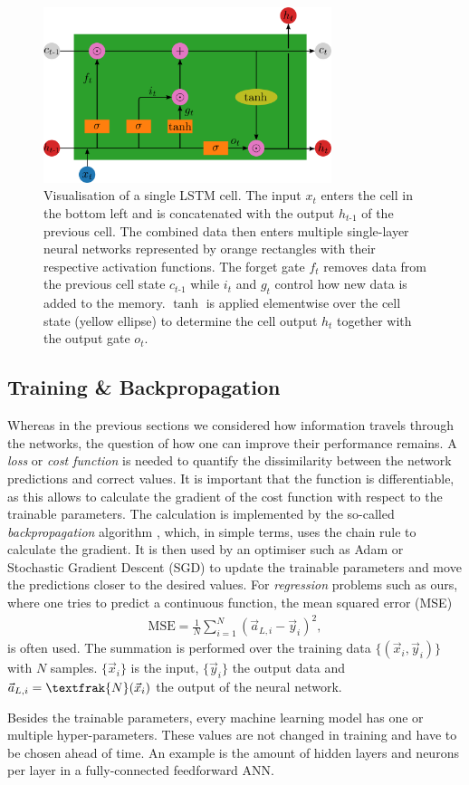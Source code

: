 \begin{figure}[h]
	\centering
	\includegraphics[width=0.75\textwidth]{img/lstm}
	\caption{Visualisation of a single LSTM cell. The input $x_t$ enters the cell in the bottom left and is concatenated with the output $h_{t\text{-}1}$ of the previous cell. The combined data then enters multiple single-layer neural networks represented by orange rectangles with their respective activation functions. The forget gate $f_t$ removes data from the previous cell state $c_{t\text{-}1}$ while $i_t$ and $g_t$ control how new data is added to the memory. $\tanh$ is applied elementwise over the cell state (yellow ellipse) to determine the cell output $h_t$ together with the output gate $o_t$.}
	\label{lstm}
\end{figure}

\newpage

\subsection{Training \& Backpropagation} \label{trainbackprop}
Whereas in the previous sections we considered how information travels through the networks, the question of how one can improve their performance remains.
A \textit{loss} or \textit{cost function} is needed to quantify the dissimilarity between the network predictions and correct values.
It is important that the function is differentiable, as this allows to calculate the gradient of the cost function with respect to the trainable parameters.
The calculation is implemented by the so-called \textit{backpropagation} algorithm \cite{rumelhart1986learning, nielsenneural}, which, in simple terms, uses the chain rule to calculate the gradient.
It is then used by an optimiser such as Adam \cite{kingma2017adam} or Stochastic Gradient Descent (SGD) to update the trainable parameters and move the predictions closer to the desired values.
For \textit{regression} problems such as ours, where one tries to predict a continuous function, the mean squared error (MSE)
\begin{align*}
\mathrm{MSE} = \frac{1}{N} \sum_{i=1}^N (\vec{a}_{L, i} - \vec{y}_i)^2,
\end{align*}
is often used.
The summation is performed over the training data $\{(\vec{x}_i, \vec{y}_i)\}$ with $N$ samples.
$\{\vec{x}_i\}$ is the input, $\{\vec{y}_i\}$ the output data and $\vec{a}_{L, i} = \textfrak{N}(\vec{x}_i)$ the output of the neural network.

Besides the trainable parameters, every machine learning model has one or multiple hyper-parameters.
These values are not changed in training and have to be chosen ahead of time.
An example is the amount of hidden layers and neurons per layer in a fully-connected feedforward ANN.
